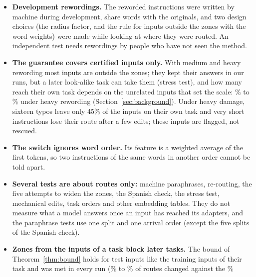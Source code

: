 \begin{itemize}
  before the runs: correct certificates rose, but wrong ones rose with them (hidden states, paraphrase
  ruler) or stayed above the bar (sentence encoder \WidenEncPrimM{}\%, judge \WidenJudgeFrM{}\%,
  sentence-by-sentence judge \WidenSentItM{}\% with \WidenSentItP{}\% correct on the Italian pivot,
  against 9\% for a failure and 5\% for a success; Appendix~\ref{app:widen}). A sentence-encoder zone
  chosen after the runs was ahead of \cert{} on each measure on held-out paraphrases, but by less than
  the margin fixed in advance and not on every measure in other splits, so we do not claim it.
  \item \textbf{Development rewordings.} The reworded instructions were written by machine during
  development, share words with the originals, and two design choices (the radius factor, and the rule
  for inputs outside the zones with the word weights) were made while looking at where they were routed.
  An independent test needs rewordings by people who have not seen the method.
  \item \textbf{The guarantee covers certified inputs only.} With medium and heavy rewording most inputs
  are outside the zones; they kept their answers in our runs, but a later look-alike task can take them
  (stress test), and how many reach their own task depends on the unrelated inputs that set the scale:
  \BackgroundHeavyLow{}\% to \BackgroundHeavyHigh{}\% under heavy rewording (Section~\ref{sec:background}).
  Under heavy damage, sixteen typos leave only 45\% of the inputs on their own task and very short
  instructions lose their route after a few edits; these inputs are flagged, not rescued.
  \item \textbf{The switch ignores word order.} Its feature is a weighted average of the first tokens, so two instructions of the same words in another order cannot be told apart.
  \item \textbf{Several tests are about routes only:} machine paraphrases, re-routing, the five attempts to
  widen the zones, the Spanish check, the stress test, mechanical edits, task orders and other embedding
  tables. They do not measure what a model answers once an input has reached its adapters, and the
  paraphrase tests use one split and one arrival order (except the five splits of the Spanish check).
  \item \textbf{Zones from the inputs of a task block later tasks.} The bound of Theorem~\ref{thm:bound}
  holds for test inputs like the training inputs of their task and was met in every run
  (\BoundAllChangedLow{}\% to \BoundAllChangedHigh{}\% of routes changed against the \BoundAlpha{}\%

\end{itemize}

